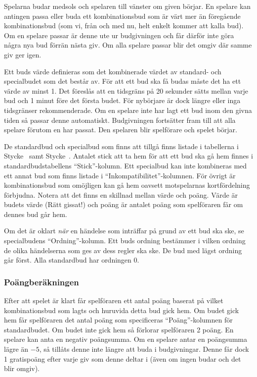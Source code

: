 \documentclass[a4paper]{article}
\begin{document}
				Spelarna budar medsols och spelaren till vänster om given börjar. En spelare kan antingen passa eller buda ett kombinationsbud som är värt mer än föregående kombinationsbud (som vi, från och med nu, helt enkelt kommer att kalla bud). Om en spelare passar är denne ute ur budgivningen och får därför inte göra några nya bud förrän nästa giv. Om alla spelare passar blir det omgiv där samme giv ger igen.

				Ett buds värde definieras som det kombinerade värdet av standard- och specialbudet som det består av. För att ett bud ska få budas måste det ha ett värde av minst 1. Det föreslås att en tidsgräns på 20 sekunder sätts mellan varje bud och 1 minut före det första budet. För nybörjare är dock längre eller inga tidsgränser rekommenderade. Om en spelare inte har lagt ett bud inom den givna tiden så passar denne automatiskt. Budgivningen fortsätter fram till att alla spelare förutom en har passat. Den spelaren blir spelförare och spelet börjar.

				De standardbud och specialbud som finns att tillgå finns listade i tabellerna i Stycke~ samt Stycke~. Antalet stick att ta hem för att ett bud ska gå hem finnes i standardbudstabellens ``Stick''-kolumn. Ett specialbud kan inte kombineras med ett annat bud som finns listade i ``Inkompatibilitet''-kolumnen. För övrigt är kombinationsbud som omöjligen kan gå hem oavsett motspelarnas kortfördelning förbjudna. Notera att det finns en skillnad mellan värde och poäng. Värde är budets värde (Rätt gissat!) och poäng är antalet poäng som spelföraren får om dennes bud går hem.

				Om det är oklart \emph{när} en händelse som inträffar på grund av ett bud ska ske, se specialbudens ``Ordning''-kolumn. Ett buds ordning bestämmer i vilken ordning de olika händelserna som ges av dess regler ska ske. De bud med lägst ordning går först. Alla standardbud har ordningen 0.

			\subsubsection{Poängberäkningen}
				Efter att spelet är klart får spelföraren ett antal poäng baserat på vilket kombinationsbud som lagts och huruvida detta bud gick hem. Om budet gick hem får spelföraren det antal poäng som specificeras ``Poäng''-kolumnen för standardbudet. Om budet inte gick hem så förlorar spelföraren 2 poäng. En spelare kan anta en negativ poängsumma. Om en spelare antar en poängsumma lägre än $-5$, så tillåts denne inte längre att buda i budgivningar. Denne får dock 1 gratispoäng efter varje giv som denne deltar i (även om ingen budar och det blir omgiv).
\end{document}
